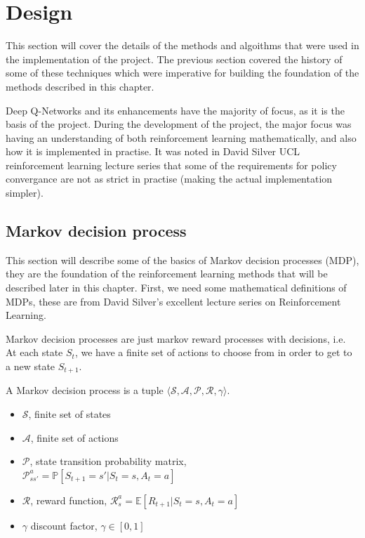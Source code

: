 \chapter{Design}
This section will cover the details of the methods and algoithms that were used in the implementation of the project. The previous section covered the history of some of these techniques which were imperative for building the foundation of the methods described in this chapter.

Deep Q-Networks and its enhancements have the majority of focus, as it is the basis of the project. During the development of the project, the major focus was having an understanding of both reinforcement learning mathematically, and also how it is implemented in practise. It was noted in David Silver UCL reinforcement learning lecture series \cite{davidsilver-course} that some of the requirements for policy convergance are not as strict in practise (making the actual implementation simpler).

\section{Markov decision process}
\label{dsgn:sec:mdp}
This section will describe some of the basics of Markov decision processes (MDP), they are the foundation of the reinforcement learning methods that will be described later in this chapter. First, we need some mathematical definitions of MDPs, these are from David Silver's excellent lecture series on Reinforcement Learning.

Markov decision processes are just markov reward processes with decisions, i.e. At each state $S_t$, we have a finite set of actions to choose from in order to get to a new state $S_{t+1}$.

\begin{defn}
	A Markov decision process is a tuple $\langle \mathcal{S}, \mathcal{A}, \mathcal{P}, \mathcal{R}, \gamma \rangle$.
	\begin{itemize}
		\item $\mathcal{S}$, finite set of states
		\item $\mathcal{A}$, finite set of actions
		\item $\mathcal{P}$, state transition probability matrix,~\\$\mathcal{P}_{ss'}^a = \mathbb{P}[S_{t+1}=s'|S_t=s, A_t=a]$
		\item $\mathcal{R}$, reward function, $\mathcal{R}_s^a = \mathbb{E}[R_{t+1}|S_t=s,A_t=a]$
		\item $\gamma$ discount factor, $\gamma\in[0,1]$
	\end{itemize}
\end{defn}


